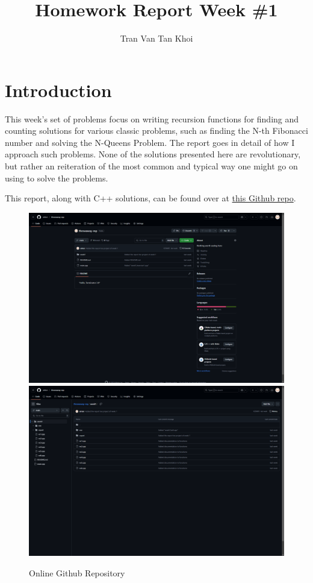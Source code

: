 \documentclass{article}
\author{Tran Van Tan Khoi}
\title{Homework Report Week \#1}
\begin{document}
    \maketitle

    \section{Introduction}
    
    This week's set of problems focus on writing recursion functions for finding and counting solutions for various classic problems, such as finding the N-th Fibonacci number and solving the N-Queens Problem. The report goes in detail of how I approach such problems. None of the solutions presented here are revolutionary, but rather an reiteration of the most common and typical way one might go on using to solve the problems.


    This report, along with C++ solutions, can be found over at \href{https://github.com/xtrkoi/throwaway-rep}{this Github repo}.

    \begin{figure}[!h]
        \centering
        \includegraphics[width=12cm]{figure1.png}\hfil
        \includegraphics[width=12cm]{figure2.png}
        \caption{Online Github Repository}
    \end{figure}
\end{document}
